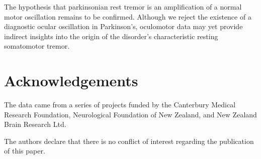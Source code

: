 \documentclass[jou,a4paper]{apa6}
\begin{document}
The hypothesis that parkinsonian rest tremor is an amplification of a normal motor oscillation remains to be confirmed. Although we reject the existence of a diagnostic ocular oscillation in Parkinson's, oculomotor data may yet provide indirect insights into the origin of the disorder's characteristic resting somatomotor tremor.


\section{Acknowledgements}
The data came from a series of projects funded by the Canterbury Medical Research Foundation, Neurological Foundation of New Zealand, and New Zealand Brain Research Ltd.

The authors declare that there is no conflict of interest regarding the
publication of this paper.


\end{document}
